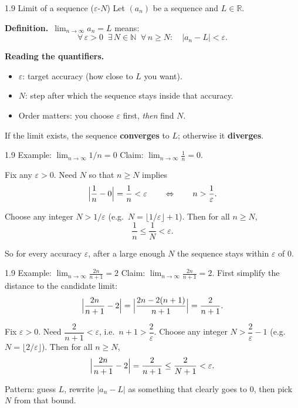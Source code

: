 \documentclass[11pt,aspectratio=169]{beamer}
\begin{document}
\begin{frame}{1.9 Limit of a sequence ($\varepsilon$-$N$)}
  \footnotesize
  Let $(a_n)$ be a sequence and $L\in\mathbb{R}$.

  \medskip
  \textbf{Definition.}\ $\displaystyle\lim_{n\to\infty}a_n=L$ means:
  \[
    \forall\,\varepsilon>0\;\;\exists\,N\in\mathbb{N}\;\;\forall\,n\ge N:\quad
    |a_n-L|<\varepsilon.
  \]

  \medskip
  \textbf{Reading the quantifiers.}
  \begin{itemize}\itemsep2pt
    \item $\varepsilon$: target accuracy (how close to $L$ you want).
    \item $N$: step after which the sequence stays inside that accuracy.
    \item Order matters: you choose $\varepsilon$ first, \emph{then} find $N$.
  \end{itemize}

  \medskip
  {\scriptsize If the limit exists, the sequence \textbf{converges} to $L$;
  otherwise it \textbf{diverges}.}
\end{frame}

\begin{frame}{1.9 Example: $\lim_{n\to\infty} 1/n = 0$}
  \footnotesize
  Claim: $\displaystyle\lim_{n\to\infty}\frac{1}{n}=0$.

  \medskip
  Fix any $\varepsilon>0$. Need $N$ so that $n\ge N$ implies
  \[
    \Bigl|\frac{1}{n}-0\Bigr|=\frac{1}{n}<\varepsilon
    \qquad\Leftrightarrow\qquad
    n>\frac{1}{\varepsilon}.
  \]

  \medskip
  Choose any integer $N>1/\varepsilon$
  (e.g.\ $N=\bigl\lfloor 1/\varepsilon\bigr\rfloor+1$).
  Then for all $n\ge N$,
  \[
    \frac{1}{n}\le\frac{1}{N}<\varepsilon.
  \]

  \medskip
  {\scriptsize So for every accuracy $\varepsilon$, after a large enough $N$ the sequence stays
  within $\varepsilon$ of $0$.}
\end{frame}

\begin{frame}{1.9 Example: $\lim_{n\to\infty}\frac{2n}{n+1}=2$}
  \footnotesize
  Claim: $\displaystyle\lim_{n\to\infty}\frac{2n}{n+1}=2$.
  First simplify the distance to the candidate limit:
  \[
    \Bigl|\frac{2n}{n+1}-2\Bigr|
    =\Bigl|\frac{2n-2(n+1)}{n+1}\Bigr|
    =\frac{2}{n+1}.
  \]

  \medskip
  Fix $\varepsilon>0$. Need $\dfrac{2}{n+1}<\varepsilon$, i.e.\ $n+1>\dfrac{2}{\varepsilon}$.
  Choose any integer $N>\dfrac{2}{\varepsilon}-1$
  (e.g.\ $N=\bigl\lfloor 2/\varepsilon\bigr\rfloor$).
  Then for all $n\ge N$,
  \[
    \Bigl|\frac{2n}{n+1}-2\Bigr|
    =\frac{2}{n+1}
    \le\frac{2}{N+1}
    <\varepsilon.
  \]

  \medskip
  {\scriptsize Pattern: guess $L$, rewrite $|a_n-L|$ as something that clearly goes to $0$,
  then pick $N$ from that bound.}
\end{frame}
\end{document}

